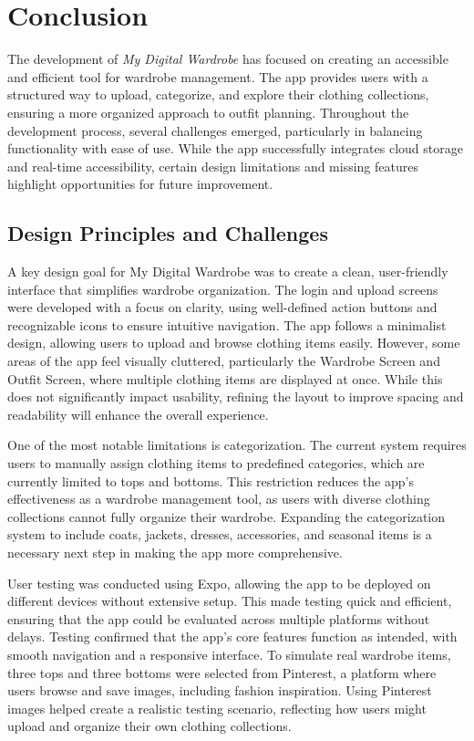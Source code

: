 \chapter{Conclusion}
\label{chap:Chaptert6}
The development of \textit{My Digital Wardrobe} has focused on creating an accessible and efficient tool for wardrobe management. The app provides users with a structured way to upload, categorize, and explore their clothing collections, ensuring a more organized approach to outfit planning. Throughout the development process, several challenges emerged, particularly in balancing functionality with ease of use. While the app successfully integrates cloud storage and real-time accessibility, certain design limitations and missing features highlight opportunities for future improvement.

\section{Design Principles and Challenges}
A key design goal for My Digital Wardrobe was to create a clean, user-friendly interface that simplifies wardrobe organization. The login and upload screens were developed with a focus on clarity, using well-defined action buttons and recognizable icons to ensure intuitive navigation. The app follows a minimalist design, allowing users to upload and browse clothing items easily. However, some areas of the app feel visually cluttered, particularly the Wardrobe Screen and Outfit Screen, where multiple clothing items are displayed at once. While this does not significantly impact usability, refining the layout to improve spacing and readability will enhance the overall experience.

One of the most notable limitations is categorization. The current system requires users to manually assign clothing items to predefined categories, which are currently limited to tops and bottoms. This restriction reduces the app’s effectiveness as a wardrobe management tool, as users with diverse clothing collections cannot fully organize their wardrobe. Expanding the categorization system to include coats, jackets, dresses, accessories, and seasonal items is a necessary next step in making the app more comprehensive.

User testing was conducted using Expo, allowing the app to be deployed on different devices without extensive setup. This made testing quick and efficient, ensuring that the app could be evaluated across multiple platforms without delays. Testing confirmed that the app’s core features function as intended, with smooth navigation and a responsive interface. To simulate real wardrobe items, three tops and three bottoms were selected from Pinterest, a platform where users browse and save images, including fashion inspiration. Using Pinterest images helped create a realistic testing scenario, reflecting how users might upload and organize their own clothing collections.

